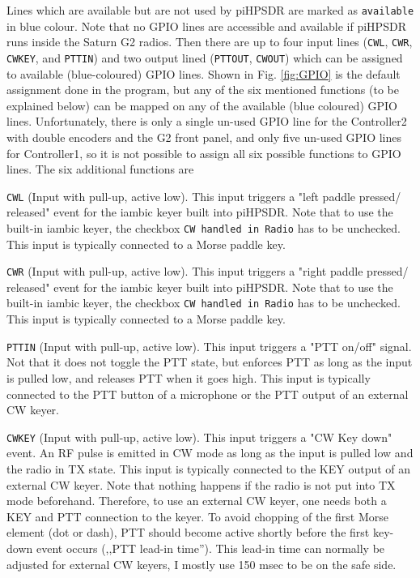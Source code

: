 \documentclass[12pt]{book}
\def\rett#1{\texttt{\color{red}#1}}
\def\bltt#1{\texttt{\color{blue}#1}}
\def\pH{pi\-HPSDR\xspace}
\begin{document}
Lines which are available but are not used by \pH are marked as \texttt{available} in blue colour.
{\color{red} Note that no GPIO lines are accessible and available if \pH runs inside the Saturn G2 radios.}
Then there are up to four input lines (\texttt{CWL}, \texttt{CWR}, \texttt{CWKEY}, and \texttt{PTTIN})
and two output lined (\texttt{PTTOUT}, \texttt{CWOUT}) which can be assigned to available (blue-coloured)
GPIO lines. Shown in Fig. \ref{fig:GPIO} is the default assignment done in the program, but any of the
six mentioned functions (to be explained below) can be mapped on any of the available (blue coloured)
GPIO lines. Unfortunately, there is only a single un-used GPIO line for the Controller2 with double
encoders and the G2 front panel, and only five un-used GPIO lines for Controller1, so it is not possible
to assign all six possible functions to GPIO lines. The six additional functions are

\rett{CWL} (Input with pull-up, active low). This input triggers a "left paddle pressed/
released" event for the
iambic keyer built into \pH. Note that to use the built-in iambic keyer, the checkbox
\bltt{CW handled in Radio} has to be unchecked. This input is typically connected to
a Morse paddle key.

\rett{CWR} (Input with pull-up, active low). This input triggers a "right paddle pressed/
released" event for the
iambic keyer built into \pH. Note that to use the built-in iambic keyer, the checkbox
\bltt{CW handled in Radio} has to be unchecked. This input is typically connected to
a Morse paddle key.


\rett{PTTIN} (Input with pull-up, active low). This input triggers a "PTT on/off" signal.
Not that it does not toggle the PTT state, but enforces PTT as long as the input is pulled low,
and releases PTT when it goes high. This input is typically connected to the PTT button of
a microphone or the PTT output of an external CW keyer.

\rett{CWKEY} (Input with pull-up, active low). This input triggers a "CW Key down" event. An
RF pulse is emitted in CW mode as long as the input is pulled low and the radio in TX state.
This input is typically connected to the KEY output of an external CW keyer.  Note that  nothing
happens if the radio is not put into TX mode beforehand. Therefore, to use an external CW keyer,
one needs both a KEY and PTT connection to the keyer. To avoid chopping of the first Morse element
(dot or dash), PTT should become active shortly before the first key-down event occurs (,,PTT
lead-in time''). This lead-in time can normally be adjusted for external CW keyers, I mostly use
150 msec to be on the safe side.
\end{document}
